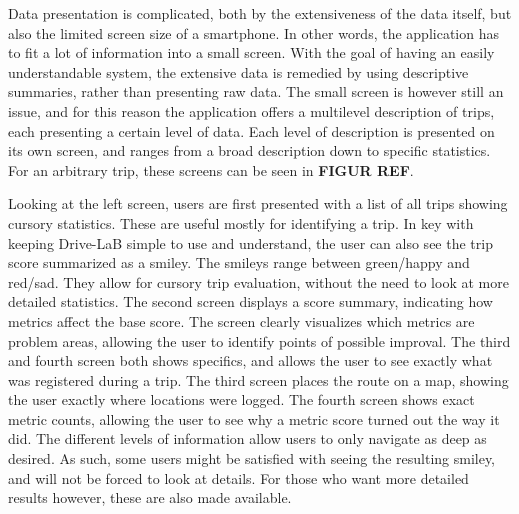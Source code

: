 Data presentation is complicated, both by the extensiveness of the data itself, but also the limited screen size of a smartphone. In other words, the application has to fit a lot of information into a small screen. With the goal of having an easily understandable system, the extensive data is remedied by using descriptive summaries, rather than presenting raw data. The small screen is however still an issue, and for this reason the application offers a multilevel description of trips, each presenting a certain level of data. Each level of description is presented on its own screen, and ranges from a broad description down to specific statistics. For an arbitrary trip, these screens can be seen in \textbf{FIGUR REF}.

Looking at the left screen, users are first presented with a list of all trips showing cursory statistics. These are useful mostly for identifying a trip. In key with keeping Drive-LaB simple to use and understand, the user can also see the trip score summarized as a smiley. The smileys range between green/happy and red/sad. They allow for cursory trip evaluation, without the need to look at more detailed statistics.
The second screen displays a score summary, indicating how metrics affect the base score. The screen clearly visualizes which metrics are problem areas, allowing the user to identify points of possible improval.
The third and fourth screen both shows specifics, and allows the user to see exactly what was registered during a trip. The third screen places the route on a map, showing the user exactly where locations were logged. The fourth screen shows exact metric counts, allowing the user to see why a metric score turned out the way it did.
The different levels of information allow users to only navigate as deep as desired. As such, some users might be satisfied with seeing the resulting smiley, and will not be forced to look at details. For those who want more detailed results however, these are also made available.